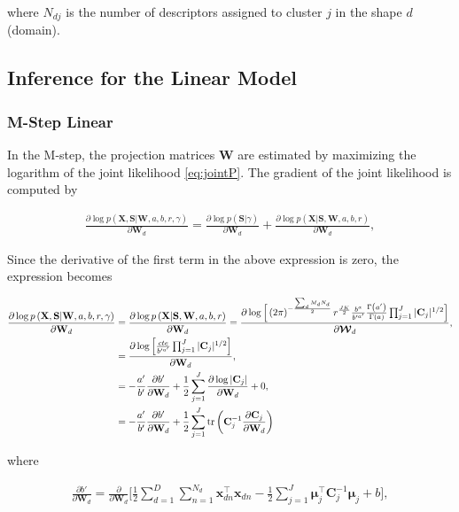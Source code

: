 \documentclass[]{article}
\newcommand{\Cin}{\mathbf{C}_j}
\newcommand{\muJ}{\boldsymbol{\mu}_j}
\newcommand{\WIn}{\mathbf{W}}
\newcommand{\setX}{\mathbf{X}}
\newcommand{\indobj}{\mathbf{x}_{dn}}
\newcommand{\projMat}{\boldsymbol{\mathcal{W}}_d}
\newcommand{\projMatI}{\mathbf{W}_d}
\newcommand{\dWjIn}{\partial\projMatI}
\begin{document}
where $N_{dj}$ is the number of descriptors assigned to cluster $j$ in the shape $d$ (domain). 

\subsection{Inference for the Linear Model}

\subsubsection{M-Step Linear}

In the M-step, the projection matrices $\WIn$ are estimated by maximizing the logarithm of the joint likelihood \eqref{eq:jointP}. The gradient of the joint likelihood is computed by

\begin{align}
\frac{\partial \log p\left(\mathbf{X},\mathbf{S}|\WIn,a,b,r,\gamma\right)}{\partial\projMatI} =
\frac{\partial \log p\left(\mathbf{S}|\gamma\right)}{\partial\projMatI} + \frac{\partial \log p\left(\mathbf{X}|\mathbf{S},\boldsymbol{\mathbf{W}},a,b,r\right)}{\partial\projMatI},
\end{align}

Since the derivative of the first term in the above expression is zero, the expression becomes

\begin{align}
\frac{\partial \log p\left(\setX,\mathbf{S}|\WIn,a,b,r,\gamma\right)}{\partial\projMatI} &=
\frac{\partial \log p\left(\setX|\mathbf{S},\WIn,a,b,r\right)}{\partial\projMatI} = \frac{\partial \log \Big[\left(2\pi\right)^{-\frac{\sum_d M_d N_d}{2}}r^{\frac{JK}{2}}\frac{b^{a}}{b'^{a'}}\frac{\Gamma\left(a'\right)}{\Gamma\left(a\right)}\prod_{j=1}^{J}|\Cin|^{1/2}\Big]}{\partial\projMat},\notag\\
&= \frac{\partial \log \Big[\frac{cte}{b'^{a'}} \prod_{j=1}^{J}|\Cin|^{1/2}\Big]}{\partial\projMatI}\notag,\\
& = -\frac{a'}{b'}\frac{\partial b'}{\dWjIn}+\frac{1}{2}\sum_{j=1}^{J}\frac{\partial \log |\Cin|}{\dWjIn}+0 , \notag \\
& =  -\frac{a'}{b'}\frac{\partial b'}{\dWjIn}+\frac{1}{2}\sum_{j=1}^{J} \operatorname{tr}\left(\Cin^{-1}\frac{\partial \Cin}{\dWjIn}\right)
\end{align}

where

\begin{align}
\frac{\partial b'}{\dWjIn} = \frac{\partial}{\dWjIn}\Big[ \frac{1}{2} \sum_{d=1}^{D}\sum_{n=1}^{N_d}\indobj^\top\indobj -\frac{1}{2}\sum_{j=1}^{J}\muJ^\top\Cin^{-1}\muJ +b \Big],
\end{align}
\end{document}
